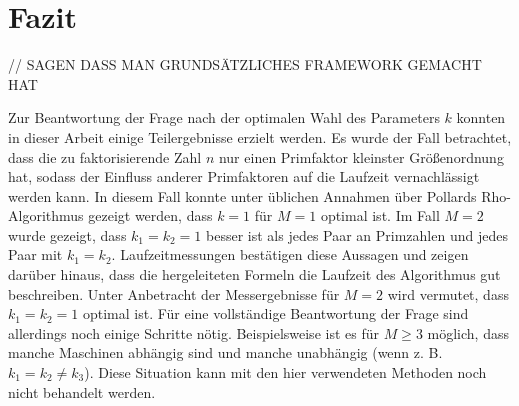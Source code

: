 \documentclass[a4paper, 11pt, ngerman]{article}
\begin{document}
\begin{figure}

\end{figure}

\section{Fazit}

// SAGEN DASS MAN GRUNDSÄTZLICHES FRAMEWORK GEMACHT HAT

Zur Beantwortung der Frage nach der optimalen Wahl des Parameters $k$ konnten in dieser Arbeit einige Teilergebnisse erzielt werden. Es wurde der Fall betrachtet, dass die zu faktorisierende Zahl $n$ nur einen Primfaktor kleinster Größenordnung hat, sodass der Einfluss anderer Primfaktoren auf die Laufzeit vernachlässigt werden kann. In diesem Fall konnte unter üblichen Annahmen über Pollards Rho-Algorithmus gezeigt werden, dass $k = 1$ für $M = 1$ optimal ist. Im Fall $M = 2$ wurde gezeigt, dass $k_1 = k_2 = 1$ besser ist als jedes Paar an Primzahlen und jedes Paar mit $k_1 = k_2$. Laufzeitmessungen bestätigen diese Aussagen und zeigen darüber hinaus, dass die hergeleiteten Formeln die Laufzeit des Algorithmus gut beschreiben. Unter Anbetracht der Messergebnisse für $M = 2$ wird vermutet, dass $k_1 = k_2 = 1$ optimal ist. Für eine vollständige Beantwortung der Frage sind allerdings noch einige Schritte nötig. Beispielsweise ist es für $M \ge 3$ möglich, dass manche Maschinen abhängig sind und manche unabhängig (wenn z. B. $k_1 = k_2 \ne k_3$). Diese Situation kann mit den hier verwendeten Methoden noch nicht behandelt werden.

\newpage
\printbibliography
\end{document}
